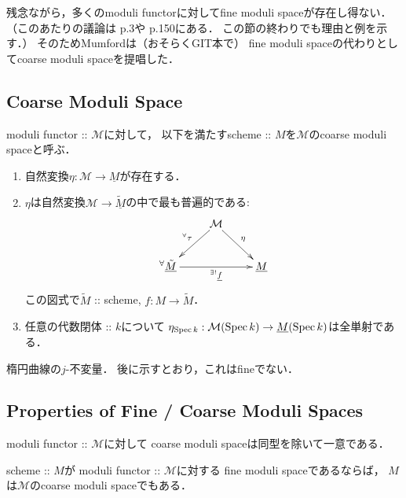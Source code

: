 \documentclass[a4paper]{jsarticle}
\newcommand{\func}[1]{\underline{#1}}
\newcommand{\ftorM}{\mathcal{M}}
\begin{document}
    残念ながら，多くのmoduli functorに対してfine moduli spaceが存在し得ない．
    （このあたりの議論は\cite{HaMo} p.3や\cite{HarDef} p.150にある．
    この節の終わりでも理由と例を示す．）
    そのためMumfordは（おそらくGIT本で）
    fine moduli spaceの代わりとしてcoarse moduli spaceを提唱した．

    \subsection{Coarse Moduli Space}
    \begin{Def}
        moduli functor :: $\ftorM$に対して，
        以下を満たすscheme :: $M$を$\ftorM$のcoarse moduli spaceと呼ぶ．
        \begin{enumerate}[label=(\roman*), leftmargin=*]
            \item
                自然変換$\eta: \ftorM \to \func{M}$が存在する．
            \item
                $\eta$は自然変換$\ftorM \to \func{\tilde{M}}$の中で最も普遍的である:
                \[
                \xymatrix
                {
                    {} & \ar[ld]_-{{}^{\forall} \tau}\ftorM \ar[rd]^-{\eta}& {} \\
                    {}^{\forall}\func{\tilde{M}} \ar[rr]_-{{}^{\exists!} \func{f}}& {} & \func{M}
                }
                \]
                この図式で$\tilde{M}$ :: scheme, $f: M \to \tilde{M}$．
            \item
                任意の代数閉体 :: $k$について
                $\eta_{\Spec k}: \ftorM(\Spec k) \to \func{M}(\Spec k)$は全単射である．
        \end{enumerate}
    \end{Def}

    \begin{Example}
        楕円曲線の$j$-不変量．
        後に示すとおり，これはfineでない．
    \end{Example}

    \subsection{Properties of Fine / Coarse Moduli Spaces}
    \begin{Prop}
        moduli functor :: $\ftorM$に対して
        coarse moduli spaceは同型を除いて一意である．
    \end{Prop}

    \begin{Prop}
        scheme :: $M$が
        moduli functor :: $\ftorM$に対する
        fine moduli spaceであるならば，
        $M$は$\ftorM$のcoarse moduli spaceでもある．
    \end{Prop}
    
\end{document}
